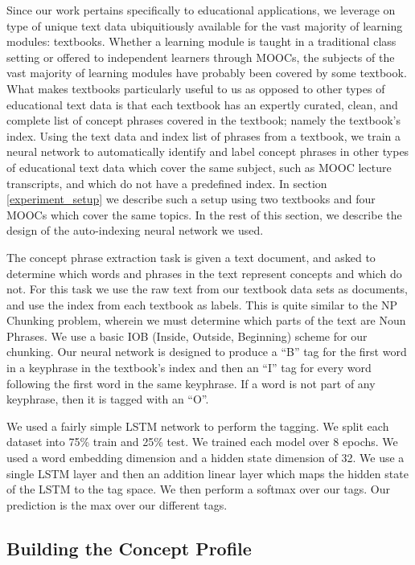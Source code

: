 Since our work pertains specifically to educational applications, we leverage on type of unique text data ubiquitiously available for the vast majority of learning modules: textbooks. Whether a learning module is taught in a traditional class setting or offered to independent learners through MOOCs, the subjects of the vast majority of learning modules have probably been covered by some textbook. What makes textbooks particularly useful to us as opposed to other types of educational text data is that each textbook has an expertly curated, clean, and complete list of concept phrases covered in the textbook; namely the textbook's index. Using the text data and index list of phrases from a textbook, we train a neural network to automatically identify and label concept phrases in other types of educational text data which cover the same subject, such as MOOC lecture transcripts, and which do not have a predefined index. In section \ref{experiment_setup} we describe such a setup using two textbooks and four MOOCs which cover the same topics. In the rest of this section, we describe the design of the auto-indexing neural network we used.

The concept phrase extraction task is given a text document, and asked to determine which words and phrases in the text represent concepts and which do not. For this task we use the raw text from our textbook data sets as documents, and use the index from each textbook as labels. This is quite similar to the NP Chunking problem, wherein we must determine which parts of the text are Noun Phrases. We use a basic IOB (Inside, Outside, Beginning) scheme for our chunking.
Our neural network is designed to produce a ``B'' tag for the first word in a keyphrase in the textbook's index and then an ``I'' tag for every word following the first word in the same keyphrase. If a word is not part of any keyphrase, then it is tagged with an ``O''.

We used a fairly simple LSTM network to perform the tagging. We split each dataset into 75\% train and 25\% test. We trained each model over 8 epochs. We used a word embedding dimension and a hidden state dimension of 32. We use a single LSTM layer and then an addition linear layer which maps the hidden state of the LSTM to the tag space. We then perform a softmax over our tags. Our prediction is the max over our different tags.


\subsection{Building the Concept Profile}

